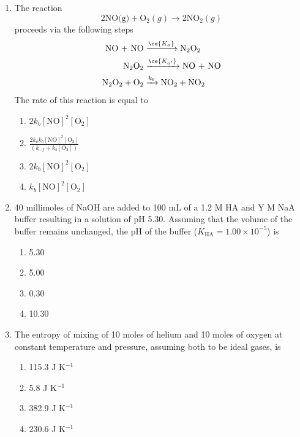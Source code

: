 \documentclass[journal,12pt,onecolumn]{IEEEtran}
\theoremstyle{remark}
\begin{document}
\begin{enumerate}
\item  The reaction \hfill{}
\[
\text{2NO(g)} + \text{O}_2(g) \rightarrow \text{2NO}_2(g)
\]
proceeds via the following steps \hfill{   }
\[
\begin{aligned}
\text{NO + NO} &\xrightarrow{\ce{K_a}} \text{N}_2\text{O}_2 \\
\text{N}_2\text{O}_2 &\xrightarrow{\ce{K_{a'}}} \text{NO + NO} \\
\text{N}_2\text{O}_2 + \text{O}_2 &\xrightarrow{k_b} \text{NO}_2 + \text{NO}_2
\end{aligned}
\]
The rate of this reaction is equal to \hfill{   }
\begin{multicols}{2}
\begin{enumerate}[label=(\Alph*)]
    \item $2k_b[\text{NO}]^2[\text{O}_2]$
    \item $\frac{2k_a k_b[\text{NO}]^2[\text{O}_2]}{(k_{-f}+k_b[\text{O}_2])}$
    \item $2k_b[\text{NO}]^2[\text{O}_2]$
    \item $k_b[\text{NO}]^2[\text{O}_2]$
\end{enumerate}
\end{multicols}

\item  40 millimoles of NaOH are added to 100 mL of a 1.2 M HA and Y M NaA buffer resulting in a solution of pH 5.30. Assuming that the volume of the buffer remains unchanged, the pH of the buffer ($K_\text{HA} = 1.00 \times 10^{-5}$) is\hfill{}
\begin{multicols}{2}
\begin{enumerate}[label=(\Alph*)]
    \item 5.30
    \item 5.00
    \item 0.30
    \item 10.30
\end{enumerate}
\end{multicols}

\item  The entropy of mixing of 10 moles of helium and 10 moles of oxygen at constant temperature and pressure, assuming both to be ideal gases, is\hfill{}
\begin{multicols}{2}
\begin{enumerate}[label=(\Alph*)]
    \item 115.3 J K$^{-1}$
    \item 5.8 J K$^{-1}$
    \item 382.9 J K$^{-1}$
    \item 230.6 J K$^{-1}$
\end{enumerate}
\end{multicols}


\end{enumerate}
\end{document}
